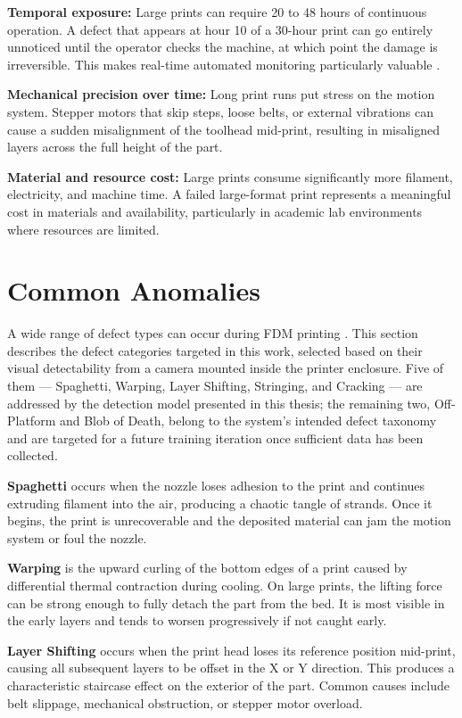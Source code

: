 \documentclass[english, Lau, oneside]{sapthesis}
\begin{document}
\textbf{Temporal exposure:} Large prints can require 20 to 48 hours of continuous operation. A defect that appears at hour 10 of a 30-hour print can go entirely unnoticed until the operator checks the machine, at which point the damage is irreversible. This makes real-time automated monitoring particularly valuable \cite{zhang2025}.

\textbf{Mechanical precision over time:} Long print runs put stress on the motion system. Stepper motors that skip steps, loose belts, or external vibrations can cause a sudden misalignment of the toolhead mid-print, resulting in misaligned layers across the full height of the part.

\textbf{Material and resource cost:} Large prints consume significantly more filament, electricity, and machine time. A failed large-format print represents a meaningful cost in materials and availability, particularly in academic lab environments where resources are limited.

\section{Common Anomalies}
A wide range of defect types can occur during FDM printing \cite{armin2025}. This section describes the defect categories targeted in this work, selected based on their visual detectability from a camera mounted inside the printer enclosure. Five of them --- Spaghetti, Warping, Layer Shifting, Stringing, and Cracking --- are addressed by the detection model presented in this thesis; the remaining two, Off-Platform and Blob of Death, belong to the system's intended defect taxonomy and are targeted for a future training iteration once sufficient data has been collected.

\textbf{Spaghetti} occurs when the nozzle loses adhesion to the print and continues extruding filament into the air, producing a chaotic tangle of strands. Once it begins, the print is unrecoverable and the deposited material can jam the motion system or foul the nozzle.

\textbf{Warping} is the upward curling of the bottom edges of a print caused by differential thermal contraction during cooling. On large prints, the lifting force can be strong enough to fully detach the part from the bed. It is most visible in the early layers and tends to worsen progressively if not caught early.

\textbf{Layer Shifting} occurs when the print head loses its reference position mid-print, causing all subsequent layers to be offset in the X or Y direction. This produces a characteristic staircase effect on the exterior of the part. Common causes include belt slippage, mechanical obstruction, or stepper motor overload.
\end{document}
